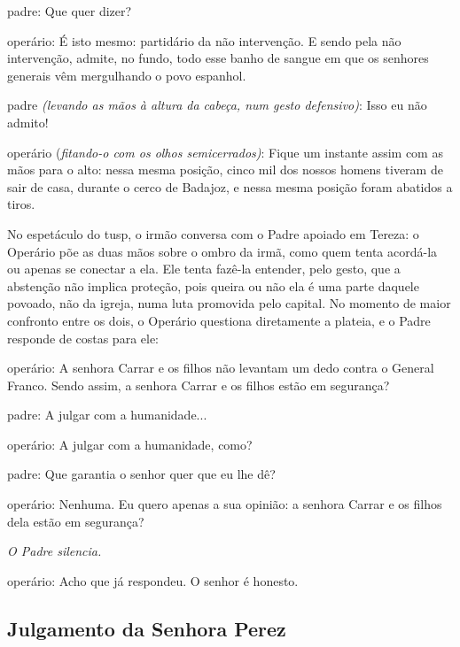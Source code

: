 {\sc padre}: Que quer dizer?

{\sc operário}: É isto mesmo: partidário da não intervenção. E sendo pela
não intervenção, admite, no fundo, todo esse banho de sangue em que os
senhores generais vêm mergulhando o povo espanhol.

{\sc padre} {\it (levando as mãos à altura da cabeça, num gesto defensivo)}:
Isso eu não admito!

{\sc operário} ({\it fitando-o com os olhos semicerrados)}: Fique um instante
assim com as mãos para o alto: nessa mesma posição, cinco mil dos nossos
homens tiveram de sair de casa, durante o cerco de Badajoz, e nessa
mesma posição foram abatidos a tiros.

No espetáculo do {\sc tusp}, o irmão conversa com o Padre apoiado em Tereza: o
Operário põe as duas mãos sobre o ombro da irmã, como quem tenta
acordá-la ou apenas se conectar a ela. Ele tenta fazê-la entender, pelo
gesto, que a abstenção não implica proteção, pois queira ou não ela é
uma parte daquele povoado, não da igreja, numa luta promovida pelo
capital. No momento de maior confronto entre os dois, o Operário
questiona diretamente a plateia, e o Padre responde de costas para ele:

{\sc operário}: A senhora Carrar e os filhos não levantam um dedo contra o
General Franco. Sendo assim, a senhora Carrar e os filhos estão em
segurança?

{\sc padre}: A julgar com a humanidade...

{\sc operário}: A julgar com a humanidade, como?

{\sc padre}: Que garantia o senhor quer que eu lhe dê?

{\sc operário}: Nenhuma. Eu quero apenas a sua opinião: a senhora Carrar e os
filhos dela estão em segurança?

{\it O Padre silencia.}

{\sc operário}: Acho que já respondeu. O senhor é honesto.


\subsection{Julgamento da Senhora Perez}

